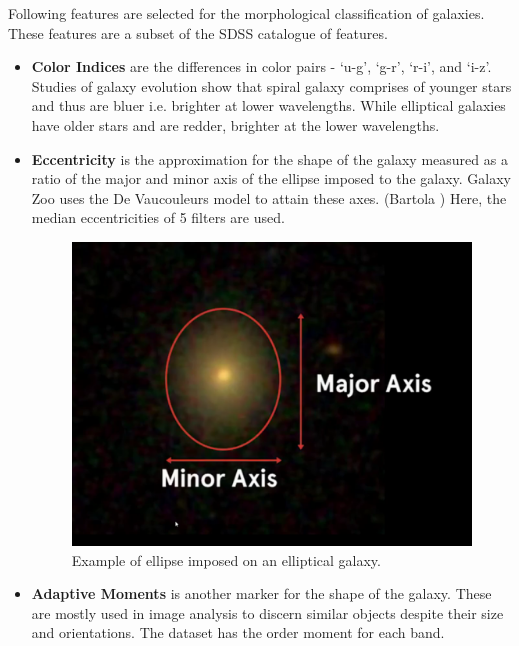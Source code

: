 Following features are selected for the morphological classification of galaxies. These features are a subset of the SDSS catalogue of features.
\begin{itemize}
	\item \textbf{Color Indices} are the differences in color pairs - `u-g', `g-r', `r-i', and `i-z'. Studies of galaxy evolution show that spiral galaxy comprises of younger stars and thus are bluer i.e. brighter at lower wavelengths. While elliptical galaxies have older stars and are redder, brighter at the lower wavelengths.
	
	\item \textbf{Eccentricity} is the approximation for the shape of the galaxy measured as a ratio of the major and minor axis of the ellipse imposed to the galaxy. Galaxy Zoo uses the De Vaucouleurs model to attain these axes. (Bartola ) Here, the median eccentricities of 5 filters are used.
	\begin{figure}[H]
		\centering
		\includegraphics[width=.6\linewidth,keepaspectratio]{images/misc/eccentricity_example.png}
		\caption{Example of ellipse imposed on an elliptical galaxy.}
		\label{fig:ecc}
	\end{figure}
	
	\item \textbf{Adaptive Moments} is another marker for the shape of the galaxy. These are mostly used in image analysis to discern similar objects despite their size and orientations. The dataset has the  order moment for each band.
	

\end{itemize}

